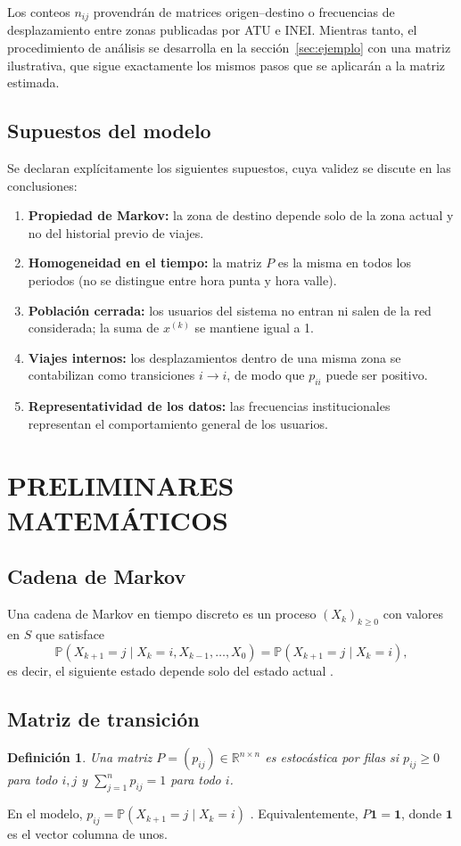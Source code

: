\documentclass[12pt]{article}
\newtheorem{definicion}{Definición}[section]
\begin{document}
Los conteos $n_{ij}$ provendrán de matrices origen--destino o frecuencias de desplazamiento entre zonas publicadas por ATU e INEI. Mientras tanto, el procedimiento de análisis se desarrolla en la sección~\ref{sec:ejemplo} con una matriz ilustrativa, que sigue exactamente los mismos pasos que se aplicarán a la matriz estimada.

\subsection{Supuestos del modelo}
Se declaran explícitamente los siguientes supuestos, cuya validez se discute en las conclusiones:
\begin{enumerate}
    \item \textbf{Propiedad de Markov:} la zona de destino depende solo de la zona actual y no del
          historial previo de viajes.
    \item \textbf{Homogeneidad en el tiempo:} la matriz $P$ es la misma en todos los periodos
          (no se distingue entre hora punta y hora valle).
    \item \textbf{Población cerrada:} los usuarios del sistema no entran ni salen de la red
          considerada; la suma de $x^{(k)}$ se mantiene igual a 1.
    \item \textbf{Viajes internos:} los desplazamientos dentro de una misma zona se contabilizan
          como transiciones $i\to i$, de modo que $p_{ii}$ puede ser positivo.
    \item \textbf{Representatividad de los datos:} las frecuencias institucionales representan el
          comportamiento general de los usuarios.
\end{enumerate}

\newpage
\section{PRELIMINARES MATEMÁTICOS}

\subsection{Cadena de Markov}
Una cadena de Markov en tiempo discreto es un proceso $(X_k)_{k\ge 0}$ con valores en $S$ que
satisface
\[
    \mathbb{P}(X_{k+1}=j \mid X_k=i, X_{k-1},\ldots,X_0)=\mathbb{P}(X_{k+1}=j \mid X_k=i),
\]
es decir, el siguiente estado depende solo del estado actual \cite{norris,kemeny}.

\subsection{Matriz de transición}
\begin{definicion}
    Una matriz $P=(p_{ij})\in\mathbb{R}^{n\times n}$ es \emph{estocástica por filas} si
    $p_{ij}\ge 0$ para todo $i,j$ y $\sum_{j=1}^{n}p_{ij}=1$ para todo $i$.
\end{definicion}
En el modelo, $p_{ij}=\mathbb{P}(X_{k+1}=j\mid X_k=i)$ \cite{norris,ross}. Equivalentemente,
$P\mathbf{1}=\mathbf{1}$, donde $\mathbf{1}$ es el vector columna de unos.
\end{document}
